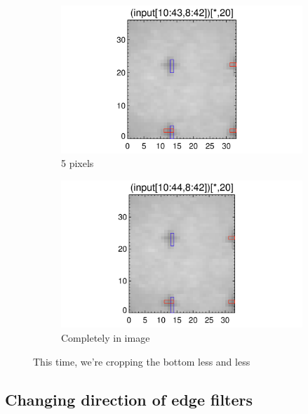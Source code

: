 \documentclass[10pt]{article}
\begin{document}
\begin{figure}[!h]
    \begin{subfigure}[b]{.45\linewidth}
        \centering
        \includegraphics[width=1.3\textwidth]{plots_tables_images/moarfidcheck_withbothtruncate5.png}
        \caption{5 pixels}
    \end{subfigure}
    \begin{subfigure}[b]{.45\linewidth}
        \centering
        \includegraphics[width=1.3\textwidth]{plots_tables_images/moarfidcheck_withbothtruncate6.png}
        \caption{Completely in image}
    \end{subfigure}
    \caption{This time, we're cropping the bottom less and less}
    \label{firstplot}
\end{figure}


\subsection{Changing direction of edge filters} %
\label{sub:changing_direction_of_edge_filters}
\end{document}
